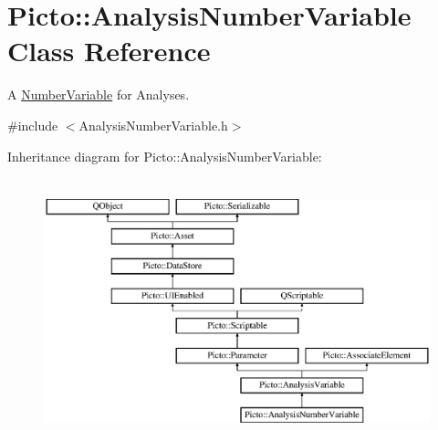 \hypertarget{class_picto_1_1_analysis_number_variable}{\section{Picto\-:\-:Analysis\-Number\-Variable Class Reference}
\label{class_picto_1_1_analysis_number_variable}
}


A \hyperlink{class_picto_1_1_number_variable}{Number\-Variable} for Analyses.  




{\ttfamily \#include $<$Analysis\-Number\-Variable.\-h$>$}

Inheritance diagram for Picto\-:\-:Analysis\-Number\-Variable\-:\begin{figure}[H]
\begin{center}
\leavevmode
\includegraphics[height=7.697594cm]{class_picto_1_1_analysis_number_variable}
\end{center}
\end{figure}
